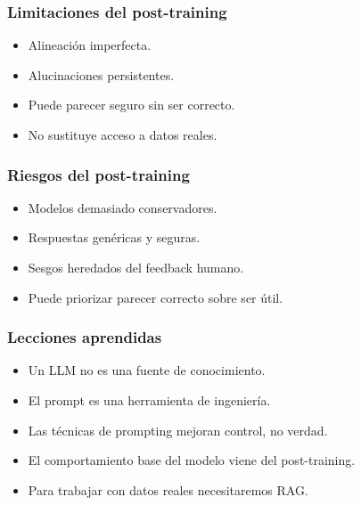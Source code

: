 \documentclass[aspectratio=169]{beamer}
\begin{document}
\begin{frame}\frametitle{Limitaciones del post-training}
\begin{itemize}
    \item Alineación imperfecta.
    \item Alucinaciones persistentes.
    \item Puede parecer seguro sin ser correcto.
    \item No sustituye acceso a datos reales.
\end{itemize}
\end{frame}

\begin{frame}\frametitle{Riesgos del post-training}
\begin{itemize}
    \item Modelos demasiado conservadores.
    \item Respuestas genéricas y seguras.
    \item Sesgos heredados del feedback humano.
    \item Puede priorizar parecer correcto sobre ser útil.
\end{itemize}
\end{frame}

\begin{frame}\frametitle{Lecciones aprendidas}
\begin{itemize}
    \item Un LLM no es una fuente de conocimiento.
    \item El prompt es una herramienta de ingeniería.
    \item Las técnicas de prompting mejoran control, no verdad.
    \item El comportamiento base del modelo viene del post-training.
    \item Para trabajar con datos reales necesitaremos RAG.
\end{itemize}
\end{frame}
\end{document}
